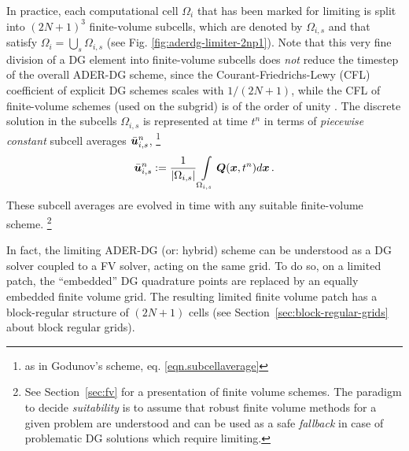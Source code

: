  In practice, each
 computational cell $\Omega_i$ that has been marked for limiting is split
 into $(2N+1)^3$ finite-volume subcells, which are denoted by
 $\Omega_{i,s}$ and that satisfy $\Omega_i = \bigcup_s \Omega_{i,s}$ (see
 Fig. \ref{fig:aderdg-limiter-2np1}). Note that this very fine division of a DG
 element into finite-volume subcells does \textit{not} reduce the timestep
 of the overall ADER-DG scheme, since the Courant-Friedrichs-Lewy (CFL)
 coefficient of explicit DG schemes scales with $1/(2N+1)$, while the CFL
 of finite-volume schemes (used on the subgrid) is of the order of
 unity \cite{Dumbser2014,Zanotti2015c,Zanotti2015c,Zanotti2015d,ADERDGVisc}.
 The discrete solution in the subcells $\Omega_{i,s}$ is
 represented at time $t^n$ in terms of \textit{piecewise constant} subcell
 averages $\bar{\boldsymbol{u}}^n_{i,s}$, \ie \footnote{as in Godunov's scheme,
 	eq. \eqref{eqn.subcellaverage} }
 \begin{equation}
 \bar{\boldsymbol{u}}^n_{i,s} := \frac{1}{|\Omega_{i,s}|} \int \limits_{\Omega_{i,s}}
 \boldsymbol{Q}(\boldsymbol{x},t^n) d \boldsymbol{x}\,.
 \end{equation}
 These subcell averages are evolved in time with any {suitable}
 finite-volume scheme. \footnote{See Section~\ref{sec:fv} for a presentation of
   finite volume schemes. The  paradigm to decide
   \emph{suitability} is to assume that robust finite volume methods for
   a given problem are understood and can be used as a safe \emph{fallback}
   in case of problematic DG solutions which require limiting.
 } 
 
 In fact, the limiting ADER-DG (or: hybrid) scheme can be understood as
 a DG solver  coupled to a FV solver, acting on the same grid. To do so,
 on a limited patch, the ``embedded'' DG quadrature points are replaced by
 an equally embedded finite volume grid. The resulting limited 
 finite volume patch has a block-regular structure of $(2N+1)$
 cells (see Section~\ref{sec:block-regular-grids} about block regular grids). 
 
